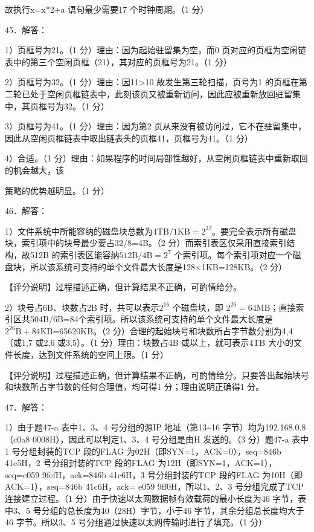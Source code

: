 \documentclass[UTF8,11pt]{ctexart}
\begin{document}
故执行x=x*2+a 语句最少需要17 个时钟周期。（1 分）


45．解答：


1）页框号为21。（1 分）理由：因为起始驻留集为空，而0 页对应的页框为空闲链表中的第三个空闲页框（21），其对应的页框号为21。（1 分）


2）页框号为32。（1 分）理由：因11>10 故发生第三轮扫描，页号为1 的页框在第二轮已处于空闲页框链表中，此刻该页又被重新访问，因此应被重新放回驻留集中，其页框号为32。（1 分）


3）页框号为41。（1 分）理由：因为第2 页从来没有被访问过，它不在驻留集中，因此从空闲页框链表中取出链表头的页框41，页框号为41。（1 分）


4）合适。（1 分）理由：如果程序的时间局部性越好，从空闲页框链表中重新取回的机会越大，该


策略的优势越明显。（1 分）


46．解答：


1）文件系统中所能容纳的磁盘块总数为\(\displaystyle 4\mathrm{TB}/1\mathrm{KB}=2^{32}\)。要完全表示所有磁盘块，索引项中的块号最少要占32/8=4B。（2 分）而索引表区仅采用直接索引结构，故512B 的索引表区能容纳\(\displaystyle 512\mathrm{B}/4\mathrm{B}=2^7\) 个索引项。每个索引项对应一个磁盘块，所以该系统可支持的单个文件最大长度是128×1KB=128KB。（2 分）


【评分说明】过程描述正确，但计算结果不正确，可酌情给分。


2）块号占6B、块数占2B 时，共可以表示\(\displaystyle 2^{16}\) 个磁盘块，即 \(\displaystyle 2^{26}=64\mathrm{MB}\)；直接索引区共504B/6B=84个索引项。所以该系统可支持的单个文件最大长度是\(\displaystyle 2^{26}\mathrm{B}+84\mathrm{KB}\)=65620KB。（2 分）合理的起始块号和块数所占字节数分别为4,4（或1,7 或2,6 或3,5）。（1 分）理由：块数占4B 或以上，就可表示4TB 大小的文件长度，达到文件系统的空间上限。（1 分）


【评分说明】过程描述正确，但计算结果不正确，可酌情给分。只要答出起始块号和块数所占字节数的任何合理值，均可得1 分；理由说明正确得1 分。


47．解答：


1）由于题47-a 表中1、3、4 号分组的源IP 地址（第13\textasciitilde{}16 字节）均为192.168.0.8（c0a8 0008H），因此可以判定1、3、4 号分组是由H 发送的。（3 分）题47-a 表中1 号分组封装的TCP 段的FLAG 为02H（即SYN=1，ACK=0），seq=846b 41c5H，2 号分组封装的TCP 段的FLAG 为12H（即SYN=1，ACK=1），seq=e059 9fefH，ack=846b 41c6H，3 号分组封装的TCP 段的FLAG 为10H（即ACK=1），seq=846b 41c6H，ack= e059 9ff0H，所以1、2、3 号分组完成了TCP 连接建立过程。（1 分）由于快速以太网数据帧有效载荷的最小长度为46 字节，表中3、5 号分组的总长度为40（28H）字节，小于46 字节，其余分组总长度均大于46 字节。所以3、5 号分组通过快速以太网传输时进行了填充。（1 分）
\end{document}
